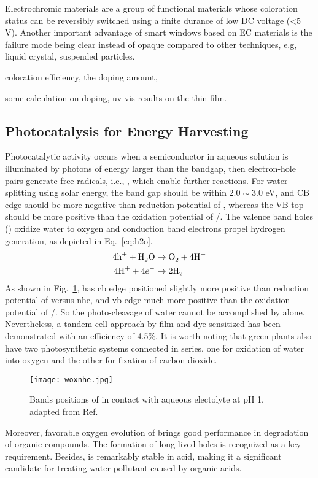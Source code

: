 Electrochromic materials are a group of functional materials whose coloration status can be reversibly switched using a finite durance of low DC voltage (\textless 5 V). Another important advantage of smart windows based on EC materials is the failure mode being clear instead of opaque compared to other techniques, e.g, liquid crystal, suspended particles. 

coloration efficiency, the doping amount, 

some calculation on doping, uv-vis results on the thin film. 
 

\subsection{Photocatalysis for Energy Harvesting}

Photocatalytic activity occurs when a semiconductor in aqueous solution is illuminated by photons of energy larger than the bandgap, then electron-hole pairs generate free radicals, i.e., , which enable further reactions. For water splitting using solar energy, the band gap should be within $2.0 \sim 3.0 $ eV, and CB edge should be more negative than reduction potential of , whereas the VB top should be more positive than the oxidation potential of /.\cite{Wang2012} The valence band holes () oxidize water to oxygen and conduction band electrons propel hydrogen generation, as depicted in Eq.~\ref{eq:h2o}.
\begin{subequations}\label{eq:h2o}
\begin{align}
4\ce{h^+} +  \ce{H2O} &\rightarrow \ce{O2} + 4\ce{H^+} \label{eq:hervb}\\
4\ce{H^+} +  4e^- &\rightarrow 2\ce{H2} \label{eq:hercb}
\end{align}
\end{subequations}
As shown in Fig.~\ref{fig:woxnhe},  has \gls{cb} edge positioned slightly more positive than reduction potential of  versus \gls{nhe}, and \gls{vb} edge much more positive than the oxidation potential of /. So the photo-cleavage of water cannot be accomplished by  alone. Nevertheless, a tandem cell approach by  film and dye-sensitized  has been demonstrated with an efficiency of 4.5\%.\cite{Michael1999} It is worth noting that green plants also have two photosynthetic systems connected in series, one for oxidation of water into oxygen and the other for fixation of carbon dioxide.
\begin{figure}[htb]
\centering
\texttt{[image: woxnhe.jpg]}
\caption[Bands positions of  versus NHE]{Bands positions of  in contact with aqueous electolyte at pH 1, adapted from Ref.\cite{Gratzel2001}}
\label{fig:woxnhe}
\end{figure}
Moreover, favorable oxygen evolution of  brings good performance in degradation of organic compounds\cite{Hepel2001,Luo2001,Watcharenwong2008}. The formation of long-lived holes is recognized as a key requirement.\cite{Pesci2011} Besides,  is remarkably stable in acid, making it a significant candidate for treating water pollutant caused by organic acids.\cite{Monllor-Satoca2006}


